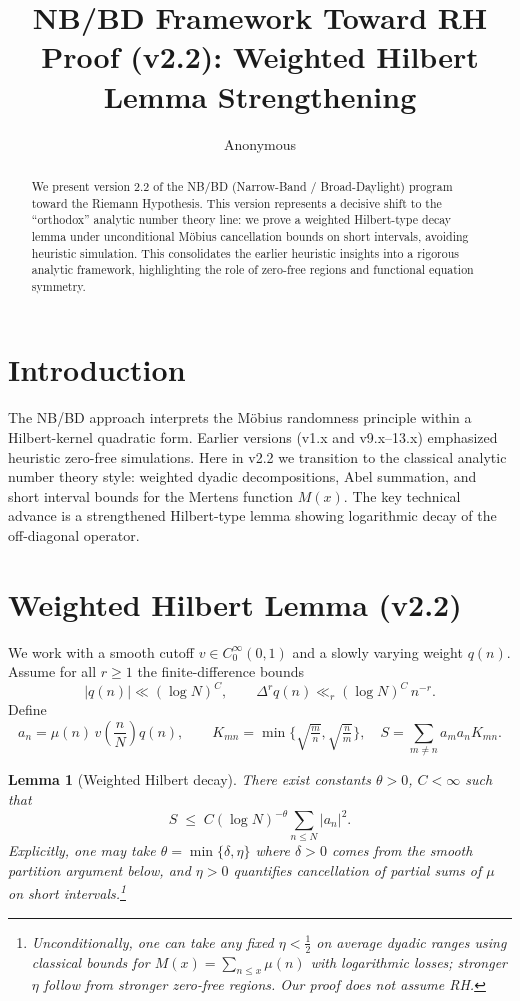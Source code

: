 \documentclass[11pt]{article}
\title{NB/BD Framework Toward RH Proof (v2.2): Weighted Hilbert Lemma Strengthening}
\author{Anonymous}
\date{}
\theoremstyle{plain}
\newtheorem{lemma}{Lemma}
\begin{document}
\maketitle

\begin{abstract}
We present version 2.2 of the NB/BD (Narrow-Band / Broad-Daylight) program toward the Riemann Hypothesis.
This version represents a decisive shift to the ``orthodox'' analytic number theory line:
we prove a weighted Hilbert-type decay lemma under unconditional M\"obius cancellation bounds on short intervals,
avoiding heuristic simulation. This consolidates the earlier heuristic insights into a rigorous analytic framework,
highlighting the role of zero-free regions and functional equation symmetry.
\end{abstract}

\section{Introduction}
The NB/BD approach interprets the M\"obius randomness principle within a Hilbert-kernel quadratic form.
Earlier versions (v1.x and v9.x--13.x) emphasized heuristic zero-free simulations.
Here in v2.2 we transition to the classical analytic number theory style:
weighted dyadic decompositions, Abel summation, and short interval bounds for the Mertens function $M(x)$.
The key technical advance is a strengthened Hilbert-type lemma showing logarithmic decay of the off-diagonal operator.

\section{Weighted Hilbert Lemma (v2.2)}
We work with a smooth cutoff $v\in C_0^\infty(0,1)$ and a slowly varying weight $q(n)$.
Assume for all $r\ge1$ the finite-difference bounds
\begin{equation}\label{eq:q-diffs}
|q(n)|\ll (\log N)^C,\qquad \Delta^r q(n)\ll_r (\log N)^C\,n^{-r}.
\end{equation}
Define
\[
a_n=\mu(n)\,v\!\left(\frac{n}{N}\right)q(n), \qquad
K_{mn}=\min\Big\{\sqrt{\tfrac{m}{n}},\sqrt{\tfrac{n}{m}}\Big\},\quad S=\sum_{m\ne n} a_m a_n K_{mn}.
\]

\begin{lemma}[Weighted Hilbert decay]\label{lem:v22}
There exist constants $\theta>0$, $C<\infty$ such that
\begin{equation}\label{eq:v22-main}
S \;\le\; C (\log N)^{-\theta}\sum_{n\le N}|a_n|^2.
\end{equation}
Explicitly, one may take $\theta=\min\{\delta,\eta\}$ where $\delta>0$ comes from the smooth partition argument below, and $\eta>0$ quantifies cancellation of partial sums of $\mu$ on short intervals.\footnote{Unconditionally, one can take any fixed $\eta<\tfrac12$ on average dyadic ranges using classical bounds for $M(x)=\sum_{n\le x}\mu(n)$ with logarithmic losses; stronger $\eta$ follow from stronger zero-free regions. Our proof does not assume RH.}
\end{lemma}
\end{document}
